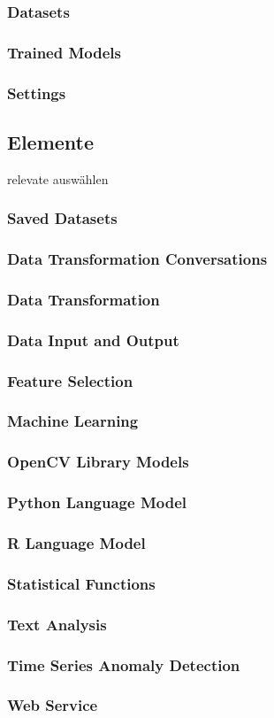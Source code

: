 \subsubsection{Datasets}
\subsubsection{Trained Models}
\subsubsection{Settings}
\subsection{Elemente}
relevate auswählen
\subsubsection{Saved Datasets}
\subsubsection{Data Transformation Conversations}
\subsubsection{Data Transformation}
\subsubsection{Data Input and Output}
\subsubsection{Feature Selection}
\subsubsection{Machine Learning}
\subsubsection{OpenCV Library Models}
\subsubsection{Python Language Model}
\subsubsection{R Language Model}
\subsubsection{Statistical Functions}
\subsubsection{Text Analysis}
\subsubsection{Time Series Anomaly Detection}
\subsubsection{Web Service}
